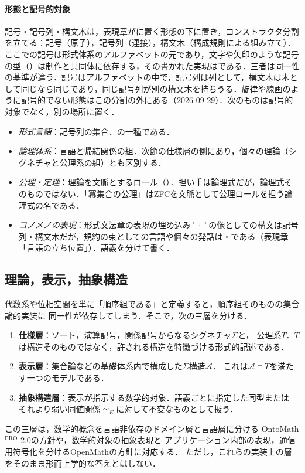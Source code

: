 \documentclass[../../main-detail.tex]{subfiles}
\begin{document}
\paragraph{形態と記号的対象} 記号・記号列・構文木は，表現章がに置く形態の下に置き，コンストラクタ分割を立てる：記号（原子），記号列（連接），構文木（構成規則による組み立て）．ここでの記号は形式体系のアルファベットの元であり，文字や矢印のような記号の型（）は制作と共同体に依存する，その書かれた実現はである．三者は同一性の基準が違う．記号はアルファベットの中で，記号列は列として，構文木は木として同じなら同じであり，同じ記号列が別の構文木を持ちうる．旋律や線画のように記号的でない形態はこの分割の外にある（2026-09-29）．次のものは記号的対象でなく，別の場所に置く．
\begin{itemize}
  \item \emph{形式言語}：記号列の集合．の一種である．
  \item \emph{論理体系}：言語と帰結関係の組．次節の仕様層の側にあり，個々の理論（シグネチャと公理系の組）とも区別する．
  \item \emph{公理・定理}：理論を文脈とするロール（）．担い手は論理式だが，論理式そのものではない．「冪集合の公理」はZFCを文脈として公理ロールを担う論理式の名である．
  \item \emph{コノメノの表現}：形式文法章の表現の埋め込み$\ulcorner\cdot\urcorner$の像としての構文は記号列・構文木だが，規約の束としての言語や個々の発話は・である（表現章「言語の立ち位置」）．語義を分けて書く．
\end{itemize}

\subsection{理論，表示，抽象構造}

代数系や位相空間を単に「順序組である」と定義すると，順序組そのものの集合論的実装に
同一性が依存してしまう．そこで，次の三層を分ける．
\begin{enumerate}
  \item \textbf{仕様層}：ソート，演算記号，関係記号からなるシグネチャ$\Sigma$と，
  公理系$T$．$T$は構造そのものではなく，許される構造を特徴づける形式的記述である．
  \item \textbf{表示層}：集合論などの基礎体系内で構成した$\Sigma$構造$\mathcal A$．
  これは$\mathcal A\models T$を満たす一つのモデルである．
  \item \textbf{抽象構造層}：表示が指示する数学的対象．語義ごとに指定した同型または
  それより弱い同値関係$\simeq_E$に対して不変なものとして扱う．
\end{enumerate}
この三層は，数学的概念を言語非依存のドメイン層と言語層に分ける
OntoMath$^{\mathrm{PRO}}$ 2.0の方針\citep{kirillovich-etal2022}や，数学的対象の抽象表現と
アプリケーション内部の表現，通信用符号化を分けるOpenMathの方針\citep{openmath2017}に対応する．
ただし，これらの実装上の層をそのまま形而上学的な答えとはしない．
\end{document}
